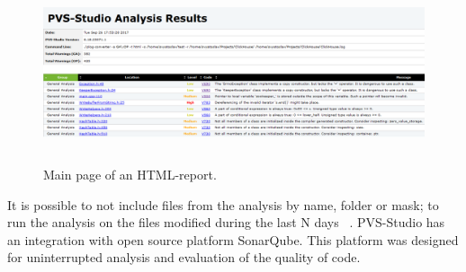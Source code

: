\begin{figure}[ht]
	\centering
	\includegraphics[height=53mm]{figures/pvs.png}
	\caption{Main page of an HTML-report.}
	\label{fig:pvs}
\end{figure}

It is possible to not include files from the analysis by name, folder or mask; to run the analysis on the files modified during the last N days ~\cite{pvs}. PVS-Studio has an integration with open source platform SonarQube. This platform was designed for uninterrupted analysis and evaluation of the quality of code.